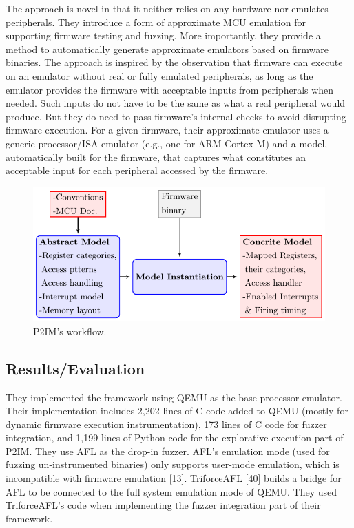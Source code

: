The approach is novel in that it neither relies on any hardware nor emulates peripherals. They introduce a form of approximate MCU emulation for supporting firmware testing and fuzzing. More importantly, they provide a method to automatically generate approximate emulators based on firmware binaries. The approach is inspired by the observation that firmware can execute on an emulator without real or fully emulated peripherals, as long as the emulator provides the firmware with acceptable inputs from peripherals when needed. Such inputs do not have to be the same as what a real peripheral would produce. But they do need to pass firmware’s internal checks to avoid disrupting firmware execution. For a given firmware, their approximate emulator uses a generic processor/ISA emulator (e.g., one for ARM Cortex-M) and a model, automatically built for the firmware, that captures what constitutes an acceptable input for each peripheral accessed by the firmware.
\begin{figure}[h]
    \centering
    \includegraphics[width=.8\linewidth]{fig-p2im} %
    \caption{P2IM's workflow.}	
    \label{fig:p2im}
\end{figure}
\subsection{Results/Evaluation}
They implemented the framework using QEMU as the base processor emulator. Their implementation includes 2,202 lines of C code added to QEMU (mostly for dynamic firmware execution instrumentation), 173 lines of C code for fuzzer integration, and 1,199 lines of Python code for the explorative execution part of P2IM. They use AFL as the drop-in fuzzer.  AFL’s emulation mode (used for fuzzing un-instrumented binaries) only supports user-mode emulation, which is incompatible with firmware emulation [13]. TriforceAFL [40] builds a bridge for AFL to be connected to the full system emulation mode of QEMU. They used TriforceAFL’s code when implementing the fuzzer integration part of their framework.

